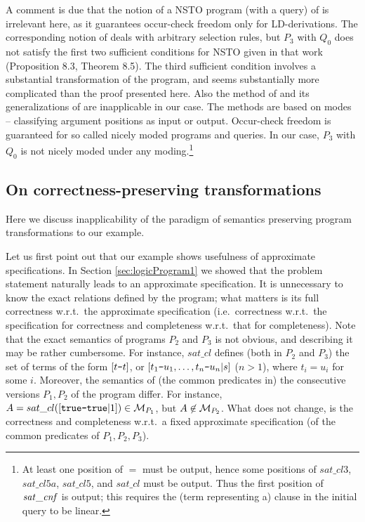 \documentclass{tlp}
\newcommand*{\mydash}{{\mbox{\tt-}}}
\newcommand*{\M}{{\ensuremath{\cal M}}\xspace}
\begin{document}
A comment is due that the notion of a NSTO program (with a query) of 
\cite{Apt-Prolog}
is irrelevant here, as it guarantees occur-check 
freedom only for LD-derivations.
The corresponding notion of \cite{Deransart.Maluszynski93}
deals with arbitrary selection rules, but $P_3$ with $Q_0$ does
not satisfy the first two sufficient conditions for NSTO given in that work
(Proposition 8.3, Theorem 8.5).
The third sufficient condition involves a substantial transformation of the
program, and seems substantially more 
complicated than the proof presented here.
Also the method of \cite{AptL95.delays} and its generalizations of
\cite{SmausHK98.PLILP98,SmausHK98.LOPSTR98} are inapplicable in our case.
The methods are based on modes -- classifying argument positions as input or
output.  Occur-check freedom is guaranteed for so called nicely moded
programs and queries.  In our case, $P_3$ with $Q_0$ is not nicely moded
under any moding.\footnote{At least one position of $=$ must be output, hence some positions of 
   $sat\_cl3$, $sat\_cl5a$,  $sat\_cl5$, and $sat\_cl$ must be output.
   Thus the first position of ${\it sat\_c n f}$  is output; this requires
   the (term representing a) clause in the initial query to be linear.
}





\subsection{On correctness-preserving transformations}
\label{sec:transformations}
Here we discuss inapplicability of the paradigm of semantics preserving
program transformations to our example.

Let us first point out that our example shows usefulness of approximate
specifications.  In Section \ref{sec:logicProgram1}
we showed that the problem statement naturally leads to an approximate
specification.  It is unnecessary to know the exact relations defined by the
program; what matters is its full correctness w.r.t.\ the approximate
specification   (i.e.\ correctness w.r.t.\ the specification for correctness
and completeness w.r.t.\ that for completeness).
Note that the exact semantics of programs $P_2$ and $P_3$ is not obvious, and
describing it may be rather cumbersome.  
For instance, $sat\_cl$ defines (both in $P_2$ and $P_3$) the set of terms of
the form $[t\mydash t]$, or
$[t_1\mydash u_1,\ldots,t_n\mydash u_n|s]$  ($n>1$), where  $t_i=u_i$
for some $i$. 
Moreover, the semantics of (the common predicates in) the consecutive versions 
$P_1, P_2$ of the program differ.  
For instance, $A = sat\_cl([{\tt true}\mydash{\tt true}|1])\in \M_{P_1}$, 
but $A\not\in \M_{P_2}$.
What does not change, is the correctness
and completeness w.r.t.\ a fixed approximate specification (of the common
predicates of $P_1, P_2, P_3$).  
\end{document}
